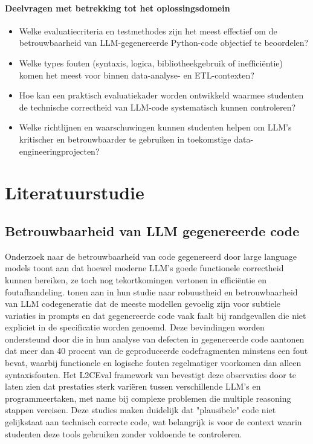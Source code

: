 \documentclass{hogent-article}
\begin{document}
\paragraph{Deelvragen met betrekking tot het \textbf{oplossingsdomein}}
\begin{itemize}
    \item Welke evaluatiecriteria en testmethodes zijn het meest effectief om de betrouwbaarheid van LLM-gegenereerde Python-code objectief te beoordelen?
    \item Welke types fouten (syntaxis, logica, bibliotheekgebruik of inefficiëntie) komen het meest voor binnen data-analyse- en ETL-contexten?
    \item Hoe kan een praktisch evaluatiekader worden ontwikkeld waarmee studenten de technische correctheid van LLM-code systematisch kunnen controleren?
    \item Welke richtlijnen en waarschuwingen kunnen studenten helpen om LLM’s kritischer en betrouwbaarder te gebruiken in toekomstige data-engineeringprojecten?
\end{itemize}




\section{Literatuurstudie}%
\label{sec:literatuurstudie}
\subsection{Betrouwbaarheid van LLM gegenereerde code}

Onderzoek naar de betrouwbaarheid van code gegenereerd door large language models toont aan dat hoewel moderne LLM's goede functionele correctheid kunnen bereiken, ze toch nog tekortkomingen vertonen in efficiëntie en foutafhandeling. \textcite{Zhong2023} tonen aan in hun studie naar robuustheid en betrouwbaarheid van LLM codegeneratie dat de meeste modellen gevoelig zijn voor subtiele variaties in prompts en dat gegenereerde code vaak faalt bij randgevallen die niet expliciet in de specificatie worden genoemd. Deze bevindingen worden ondersteund door \textcite{Esfahani2024} die in hun analyse van defecten in gegenereerde code aantonen dat meer dan 40 procent van de geproduceerde codefragmenten minstens een fout bevat, waarbij functionele en logische fouten regelmatiger voorkomen dan alleen syntaxisfouten. Het L2CEval framework van \textcite{Zhong2023} bevestigt deze observaties door te laten zien dat prestaties sterk variëren tussen verschillende LLM's en programmeertaken, met name bij complexe problemen die multiple reasoning stappen vereisen. Deze studies maken duidelijk dat "plausibele" code niet gelijkstaat aan technisch correcte code, wat belangrijk is voor de context waarin studenten deze tools gebruiken zonder voldoende te controleren.
\end{document}

